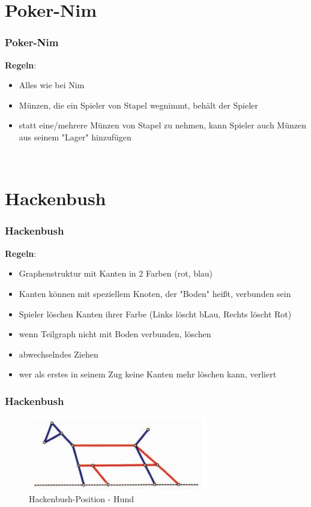 \documentclass[12pt, aspectratio=169]{beamer}
\begin{document}
\section{Poker-Nim}
\begin{frame}
    \frametitle{Poker-Nim}
    \textbf{Regeln}:
    \begin{itemize}
        \item Alles wie bei Nim
        \item Münzen, die ein Spieler von Stapel wegnimmt, behält der Spieler
        \item statt eine/mehrere Münzen von Stapel zu nehmen, kann Spieler auch Münzen aus seinem "Lager" hinzufügen 
    \end{itemize}
    \begin{center}
        \\
    \end{center}
\end{frame}

\section{Hackenbush}
\begin{frame}
    \frametitle{Hackenbush}
\textbf{Regeln}:
    \begin{itemize}
        \item Graphenstruktur mit Kanten in 2 Farben (rot, blau)
        \item Kanten können mit speziellem Knoten, der "Boden" heißt, verbunden sein
        \item Spieler löschen Kanten ihrer Farbe (\alert{L}inks löscht b\alert{L}au, \alert{R}echts löscht \alert{R}ot)
        \item wenn Teilgraph nicht mit Boden verbunden, löschen
        \item abwechselndes Ziehen
        \item wer als erstes in seinem Zug keine Kanten mehr löschen kann, verliert
    \end{itemize}
\end{frame}

\begin{frame}
    \frametitle{Hackenbush}
    \begin{figure}
        \includegraphics[width=0.7\textwidth]{pic/hackenbush.png}
        \caption{Hackenbush-Position - Hund \tiny{\cite{ww}}}
    \end{figure}
\end{frame}
\end{document}
